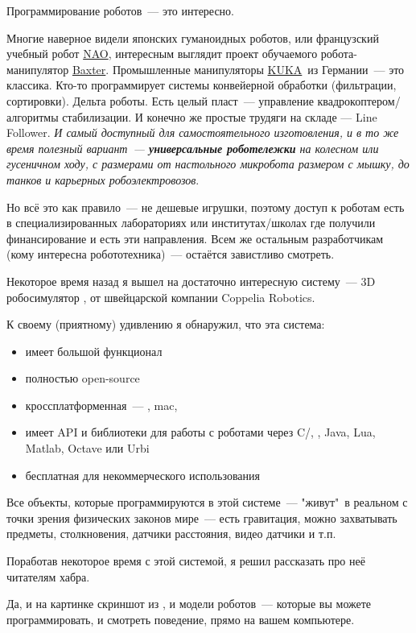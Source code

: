 \label{intro}


Программирование роботов\ --- это интересно.

Многие наверное видели японских гуманоидных роботов, или французский учебный
робот \href{https://en.wikipedia.org/wiki/Nao_(robot)}{NAO}, 
интересным выглядит проект обучаемого робота-манипулятор 
\href{http://www.rethinkrobotics.com/baxter/}{Baxter}. 
Промышленные манипуляторы 
\href{http://www.kuka-robotics.com/russia/ru/}{KUKA}\ из Германии\ --- это 
классика. Кто-то программирует системы конвейерной обработки (фильтрации, 
сортировки). Дельта роботы. Есть целый пласт\ --- управление 
квадрокоптером/алгоритмы стабилизации. И конечно же 
простые трудяги на складе — Line Follower. \textit{И самый доступный для 
самостоятельного изготовления, и в то же время полезный 
вариант\ --- \textbf{\emph{универсальные
роботележки}} на колесном или гусеничном ходу, с размерами от настольного
микробота размером с мышку, до танков и карьерных робоэлектровозов}.

\noindent
{}
\bigskip

Но всё это как правило\ --- не дешевые игрушки, поэтому доступ к роботам есть в
специализированных лабораториях или институтах/школах где получили 
финансирование и есть эти направления. Всем же остальным разработчикам (кому
интересна робототехника)\ --- остаётся завистливо смотреть.

Некоторое время назад я вышел на достаточно интересную систему\ --- 3D
робосимулятор \vrep, от швейцарской компании Coppelia Robotics.

К своему (приятному) удивлению я обнаружил, что эта система:
\begin{itemize}[nosep]
\item имеет большой функционал
\item полностью open-source
\item кроссплатформенная\ --- \win, mac, \lin{}
\item имеет API и библиотеки для работы с роботами через 
	C/\cpp, \py, Java, Lua, Matlab, Octave или Urbi
\item бесплатная для некоммерческого использования
\end{itemize}

Все объекты, которые программируются в этой системе\ --- "живут"\ в реальном с 
точки зрения физических законов мире\ --- есть гравитация, можно захватывать 
предметы, столкновения, датчики расстояния, видео датчики и т.п.

Поработав некоторое время с этой системой, я решил рассказать про неё 
читателям хабра.

Да, и на картинке скриншот из \vrep, и модели роботов\ --- которые вы можете 
программировать, и смотреть поведение, прямо на вашем компьютере.

